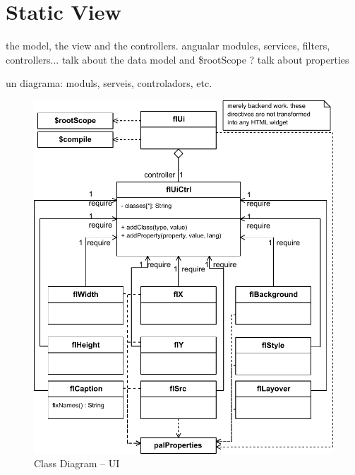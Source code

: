 \FloatBarrier

\section{Static View}
the model, the view and the controllers. angualar modules, services, filters, controllers...
talk about the data model and \$rootScope ? talk about properties

un diagrama:
moduls, serveis, controladors, etc. 

\begin{figure}[htb]
    \centering
    \includegraphics{figures/design-class-ui.pdf}
    \caption{Class Diagram -- UI}
    \label{fig:class-ui}
\end{figure}

